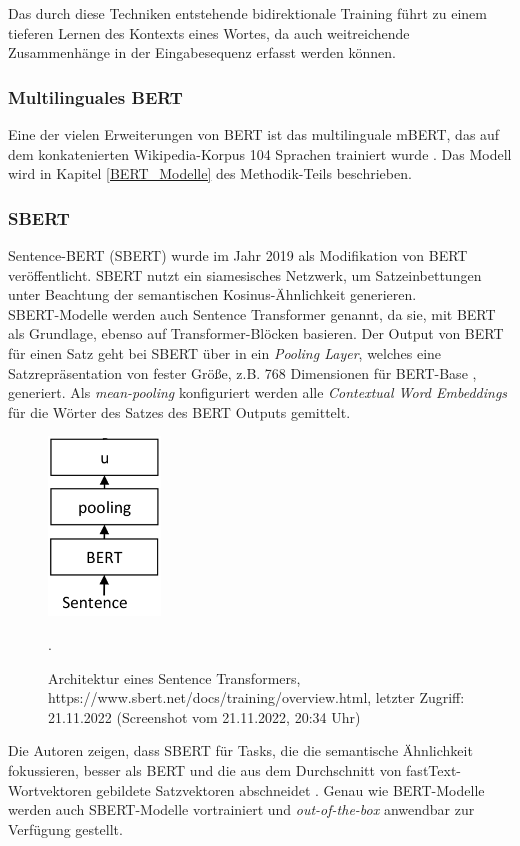 \documentclass[ngerman]{ttlab-qualify}
\begin{document}
Das durch diese Techniken entstehende bidirektionale Training führt zu einem tieferen Lernen des Kontexts eines Wortes, da auch weitreichende Zusammenhänge in der Eingabesequenz erfasst werden können.
\subsubsection{Multilinguales BERT} \label{SBERT}
Eine der vielen Erweiterungen von BERT ist das multilinguale mBERT, das auf dem konkatenierten Wikipedia-Korpus 104 Sprachen trainiert wurde \parencite{bert_multi}. Das Modell wird in Kapitel \ref{BERT_Modelle} des Methodik-Teils beschrieben.

\subsubsection{SBERT}
Sentence-BERT (SBERT) \parencite{reimers-2019-sentence-bert} wurde im Jahr 2019 als Modifikation von BERT veröffentlicht. SBERT nutzt ein siamesisches Netzwerk, um Satzeinbettungen unter Beachtung der semantischen Kosinus-Ähnlichkeit generieren.\\
SBERT-Modelle werden auch Sentence Transformer genannt, da sie, mit BERT als Grundlage, ebenso auf Transformer-Blöcken basieren. Der Output von BERT für einen Satz geht bei SBERT über in ein \textit{Pooling Layer}, welches eine Satzrepräsentation von fester Größe, z.B. 768 Dimensionen für BERT-Base \parencite{devlin-etal-2019-bert}, generiert. Als \textit{mean-pooling} konfiguriert werden alle \textit{Contextual Word Embeddings} für die Wörter des Satzes des BERT Outputs gemittelt.
\begin{figure}[H]
\begin{center}
\includegraphics[width=3cm]{grafiken/SBERT_Architecture.png}
\caption[Architektur eines Sentence Transformers]{Architektur eines Sentence Transformers,\\
https://www.sbert.net/docs/training/overview.html, letzter Zugriff:\\ 21.11.2022 (Screenshot vom 21.11.2022, 20:34 Uhr)}.
\label{SBERT_Architektur}
\end{center}
\end{figure}
\noindent Die Autoren zeigen, dass SBERT für Tasks, die die semantische Ähnlichkeit fokussieren, besser als BERT und die aus dem Durchschnitt von fastText-Wortvektoren gebildete Satzvektoren abschneidet \parencite{reimers-2019-sentence-bert}. Genau wie BERT-Modelle werden auch SBERT-Modelle vortrainiert und \textit{out-of-the-box} anwendbar zur Verfügung gestellt.
\end{document}
